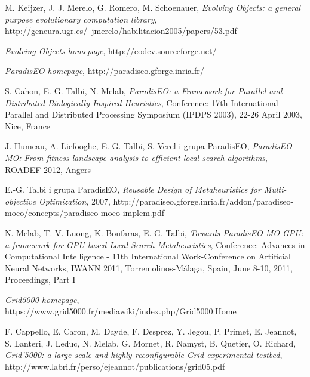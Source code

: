 \documentclass[12pt, twoside, openany, abstract=on]{report}
\theoremstyle{definition}
\begin{document}

\begin{thebibliography}{11}


 M. Keijzer, J. J. Merelo, G. Romero, M. Schoenauer, \emph{Evolving Objects: a general purpose evolutionary computation library}, http://geneura.ugr.es/~jmerelo/habilitacion2005/papers/53.pdf

 \emph{Evolving Objects homepage}, http://eodev.sourceforge.net/


 \emph{ParadisEO homepage}, http://paradiseo.gforge.inria.fr/

 S. Cahon, E.-G. Talbi, N. Melab, \emph{ParadisEO: a Framework for Parallel and Distributed Biologically Inspired Heuristics}, Conference: 17th International Parallel and Distributed Processing Symposium (IPDPS 2003), 22-26 April 2003, Nice, France

 J. Humeau, A. Liefooghe, E.-G. Talbi, S. Verel i grupa ParadisEO, \emph{ParadisEO-MO: From fitness landscape analysis to efficient local search algorithms}, ROADEF 2012, Angers

 E.-G. Talbi i grupa ParadisEO, \emph{Reusable Design of Metaheuristics for Multi-objective Optimization}, 2007, http://paradiseo.gforge.inria.fr/addon/paradiseo-moeo/concepts/paradiseo-moeo-implem.pdf

 N. Melab, T.-V. Luong, K. Boufaras, E.-G. Talbi, \emph{Towards ParadisEO-MO-GPU: a framework for GPU-based Local Search Metaheuristics}, Conference: Advances in Computational Intelligence - 11th International Work-Conference on Artificial Neural Networks, IWANN 2011, Torremolinos-Málaga, Spain, June 8-10, 2011, Proceedings, Part I



 \emph{Grid5000 homepage}, https://www.grid5000.fr/mediawiki/index.php/Grid5000:Home

 F. Cappello, E. Caron, M. Dayde, F. Desprez, Y. Jegou, P. Primet, E. Jeannot,
S. Lanteri, J. Leduc, N. Melab, G. Mornet, R. Namyst, B. Quetier, O. Richard, \emph{Grid'5000: a large scale and highly reconfigurable Grid experimental testbed}, http://www.labri.fr/perso/ejeannot/publications/grid05.pdf



\end{thebibliography}
\end{document}
